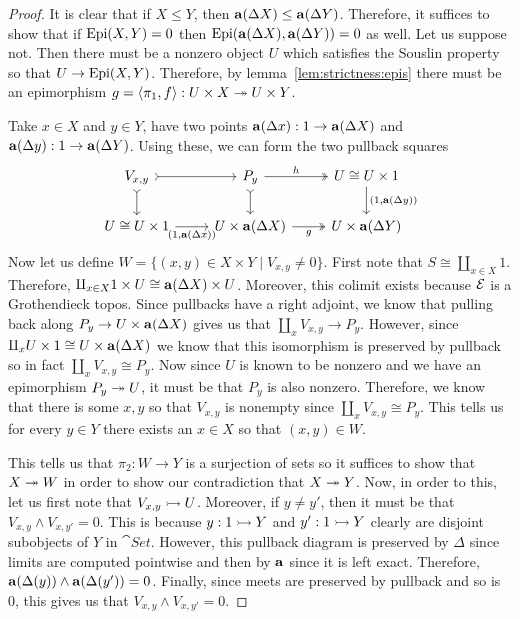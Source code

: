 \begin{proof}
  It is clear that if $X \le Y$, then
  $\mathbf{a}(\Delta X) \le \mathbf{a}(\Delta Y)$. Therefore, it
  suffices to show that if $\operatorname{Epi}(X, Y) = 0$ then
  $\operatorname{Epi}(\mathbf{a}(\Delta X), \mathbf{a}(\Delta Y)) = 0$ as well. Let
  us suppose not. Then there must be a nonzero object $U$ which
  satisfies the Souslin property so that $U \to \operatorname{Epi}(X, Y)$.
  Therefore, by lemma~\ref{lem:strictness:epis} there must be an
  epimorphism
  $g = \langle \pi_1, f \rangle : U \times X \twoheadrightarrow U \times Y$.

  Take $x \in X$ and $y \in Y$, have two points
  $\mathbf{a}(\Delta x) : 1 \to \mathbf{a}(\Delta X)$ and
  $\mathbf{a}(\Delta y) : 1 \to \mathbf{a}(\Delta Y)$. Using these, we
  can form the two pullback squares
  \[
    \begin{tikzcd}
      V_{x, y} \ar[d, rightarrowtail] \ar[r, rightarrowtail] &
      P_y \ar[d, rightarrowtail] \ar[r, "h", twoheadrightarrow] &
      {U \cong U \times 1} \ar[d, "{(1, \sheafify(\Delta y))}"]\\
      {U \cong U \times 1} \ar[r, "{(1, \sheafify(\Delta x))}", swap]&
      U \times \sheafify(\Delta X) \ar[r, "g", twoheadrightarrow, swap]&
      U \times \sheafify(\Delta Y)
    \end{tikzcd}
  \]
  Now let us define
  $W = \{(x, y) \in X \times Y \mid V_{x, y} \neq 0\}$. First note
  that $S \cong \amalg_{x \in X} 1$. Therefore,
  $\amalg_{x \in X} 1 \times U \cong \mathbf{a}(\Delta X) \times U$.
  Moreover, this colimit exists because $\mathcal{E}$ is a Grothendieck
  topos. Since pullbacks have a right adjoint, we know that pulling
  back along $P_y \to U \times \mathbf{a}(\Delta X)$ gives us that
  $\amalg_x V_{x, y} \to P_y$. However, since
  $\amalg_x U \times 1 \cong U \times \mathbf{a}(\Delta X)$ we know
  that this isomorphism is preserved by pullback so in fact
  $\amalg_x V_{x, y} \cong P_y$. Now since $U$ is known to be nonzero
  and we have an epimorphism $P_y \twoheadrightarrow U$, it must be that $P_y$ is
  also nonzero. Therefore, we know that there is some $x, y$ so that
  $V_{x, y}$ is nonempty since $\amalg_x V_{x, y} \cong P_y$. This
  tells us for every $y \in Y$ there exists an $x \in X$ so that
  $(x, y) \in W$.

  This tells us that $\pi_2 : W \to Y$ is a surjection of sets so it
  suffices to show that $X \twoheadrightarrow W$ in order to show our contradiction
  that $X \twoheadrightarrow Y$. Now, in order to this, let us first note that
  $V_{x, y} \rightarrowtail U$. Moreover, if $y \neq y'$, then it must be that
  $V_{x, y} \wedge V_{x, y'} = 0$. This is because $y : 1 \rightarrowtail Y$ and
  $y' : 1 \rightarrowtail Y$ clearly are disjoint subobjects of $Y$ in
  $\cat{Set}$. However, this pullback diagram is preserved by $\Delta$
  since limits are computed pointwise and then by $\mathbf{a}$ since it
  is left exact. Therefore,
  $\mathbf{a}(\Delta(y)) \wedge \mathbf{a}(\Delta(y')) = 0$. Finally,
  since meets are preserved by pullback and so is $0$, this gives us
  that $V_{x, y} \wedge V_{x, y'} = 0$.


\end{proof}
